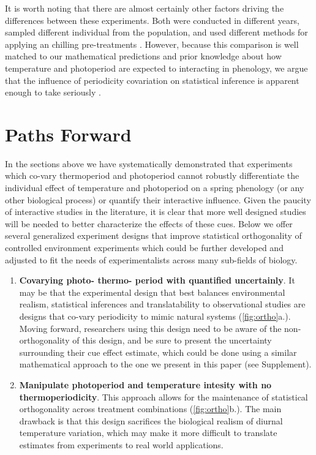 \documentclass[11pt]{article}
\begin{document}
{It is worth noting that there are almost certainly other factors driving the differences between these experiments. Both were conducted in different years, sampled different individual from the population, and used different methods for applying an chilling pre-treatments \citep{Flynn2018,Buonaiuto:2021ug}. However, because this comparison is well matched to our mathematical predictions and prior knowledge about how temperature and photoperiod are expected to interacting in phenology, we argue that the influence of periodicity covariation on statistical inference is apparent enough to take seriously .\\

\section{Paths Forward}
In the sections above we have systematically demonstrated that experiments which co-vary thermoperiod and photoperiod cannot robustly differentiate the individual effect of temperature and photoperiod on a spring phenology (or any other biological process) or quantify their interactive influence. Given the paucity of interactive studies in the literature, it is clear that more well designed studies will be needed to better characterize the effects of these cues. Below we offer several generalized experiment designs that improve statistical orthogonality of controlled environment experiments which could be further developed and adjusted to fit the needs of experimentalists across many sub-fields of biology.
\begin{enumerate}
\item \textbf{Covarying photo- thermo- period with quantified uncertainly}. It may be that the experimental design that best balances environmental realism, statistical inferences and translatability to observational studies are designs that co-vary periodicity to mimic natural systems (\ref{fig:ortho}a.). Moving forward, researchers using this design need to be aware of the non-orthogonality of this design, and be sure to present the uncertainty surrounding their cue effect estimate, which could be done using a similar mathematical approach to the one we present in this paper (see Supplement).

\item \textbf{Manipulate photoperiod and temperature intesity with no thermoperiodicity}. This approach allows for the maintenance of statistical orthogonality across treatment combinations (\ref{fig:ortho}b.). The main drawback is that this design sacrifices the biological realism of diurnal temperature variation, which may make it more difficult to translate estimates from experiments to real world applications.


\end{enumerate}}
\end{document}
